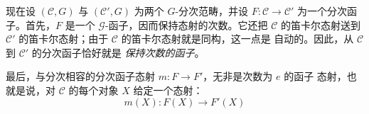 现在设 $(\mathcal C,G)$ 与 $(\mathcal C',G)$ 为两个 $G$-分次范畴，并设
$F\colon\mathcal C\to\mathcal C'$ 为一个分次函子。首先，$F$ 是一个
$\mathcal G$-函子，因而保持态射的次数。它还把 $\mathcal C$ 的笛卡尔态射送到
$\mathcal C'$ 的笛卡尔态射；由于 $\mathcal C$ 的笛卡尔态射就是同构，这一点是
自动的。因此，从 $\mathcal C$ 到 $\mathcal C'$ 的分次函子恰好就是
\emph{保持次数的函子}。

最后，与分次相容的分次函子态射 $m\colon F\to F'$，无非是次数为 $e$ 的函子
态射，也就是说，对 $\mathcal C$ 的每个对象 $X$ 给定一个态射：
\[
  m(X)\colon F(X)\longrightarrow F'(X)
\]
